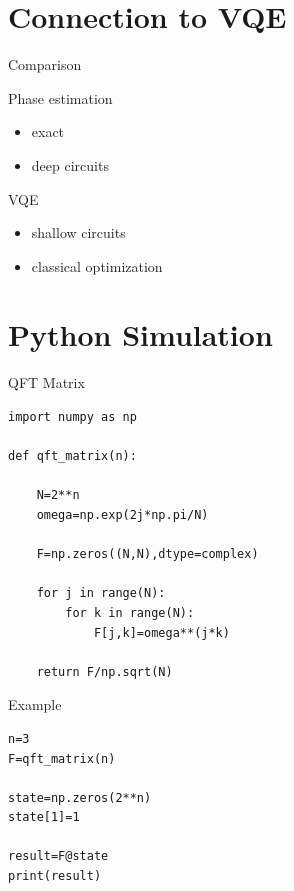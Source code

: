 \documentclass{beamer}
\begin{document}
\section{Connection to VQE}

\begin{frame}{Comparison}

Phase estimation

\begin{itemize}
\item exact
\item deep circuits
\end{itemize}

VQE

\begin{itemize}
\item shallow circuits
\item classical optimization
\end{itemize}

\end{frame}

\section{Python Simulation}

\begin{frame}[fragile]{QFT Matrix}

\begin{lstlisting}
import numpy as np

def qft_matrix(n):

    N=2**n
    omega=np.exp(2j*np.pi/N)

    F=np.zeros((N,N),dtype=complex)

    for j in range(N):
        for k in range(N):
            F[j,k]=omega**(j*k)

    return F/np.sqrt(N)
\end{lstlisting}

\end{frame}


\begin{frame}[fragile]{Example}

\begin{lstlisting}
n=3
F=qft_matrix(n)

state=np.zeros(2**n)
state[1]=1

result=F@state
print(result)
\end{lstlisting}

\end{frame}
\end{document}
